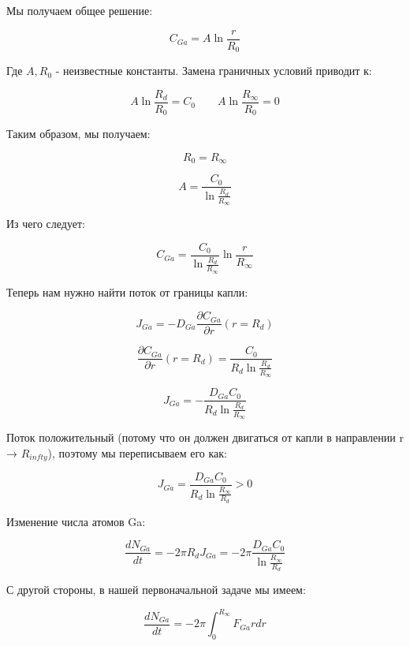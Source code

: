 \documentclass[14pt,oneside]{extarticle}
\begin{document}
Мы получаем общее решение:

\[
C_{Ga}=A\ln\frac{r}{R_{0}}
\]

Где $A,R_{0}$ - неизвестные константы. Замена граничных условий приводит к:

\[
A\ln\frac{R_{d}}{R_{0}}=C_{0}
\qquad
A\ln\frac{R_{\infty}}{R_{0}}=0
\]

Таким образом, мы получаем:

\[
R_{0}=R_{\infty}
\]

\begin{equation}
A=\frac{C_{0}}{\ln\frac{R_{d}}{R_{\infty}}}
\end{equation}

Из чего следует:

\begin{equation}
C_{Ga}=\frac{C_{0}}{\ln\frac{R_{d}}{R_{\infty}}}\ln\frac{r}{R_{\infty}}
\end{equation}

Теперь нам нужно найти поток от границы капли:

\begin{equation}
J_{Ga}=-D_{Ga}\frac{\partial C_{Ga}}{\partial r}\left(r=R_{d}\right)
\end{equation}

\begin{equation}
\frac{\partial C_{Ga}}{\partial r}\left(r=R_{d}\right)=\frac{C_{0}}{R_{d}\ln\frac{R_{d}}{R_{\infty}}}
\end{equation}

\[
J_{Ga}=-\frac{D_{Ga}C_{0}}{R_{d}\ln\frac{R_{d}}{R_{\infty}}}
\]

Поток положительный (потому что он должен двигаться от капли в направлении r → $R_{infty}$), поэтому мы переписываем его как:

\begin{equation}
J_{Ga}=\frac{D_{Ga}C_{0}}{R_{d}\ln\frac{R_{\infty}}{R_{d}}}>0
\end{equation}

Изменение числа атомов Ga:

\begin{equation}
\frac{dN_{Ga}}{dt}=-2\pi R_{d}J_{Ga}=-2\pi\frac{D_{Ga}C_{0}}{\ln\frac{R_{\infty}}{R_{d}}}
\end{equation}

С другой стороны, в нашей первоначальной задаче мы имеем:

\begin{equation}
\frac{dN_{Ga}}{dt}=-2\pi\int_{0}^{R_{\infty}}F_{Ga}rdr
\end{equation}
\end{document}
